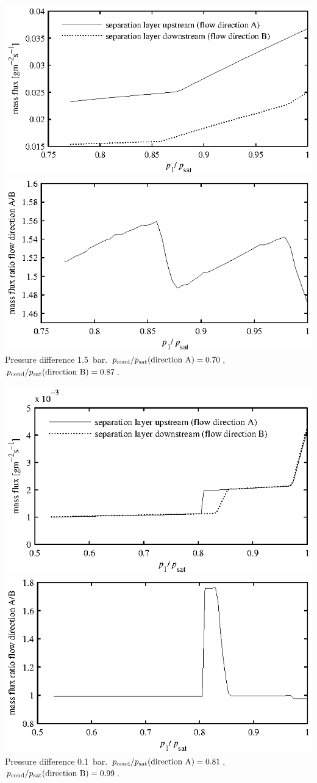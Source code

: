 \documentclass{minimal}
\begin{document}
\includegraphics{figure5.eps}
\includegraphics{figure6.eps}\\
Pressure difference 1.5~bar.
$p_\mathrm{cond}/p_\mathrm{sat}(\hbox{direction A}) = 0.70$,
$p_\mathrm{cond}/p_\mathrm{sat}(\hbox{direction B}) = 0.87$.\bigskip

\includegraphics{figure7.eps}
\includegraphics{figure8.eps}\\
Pressure difference 0.1~bar.
$p_\mathrm{cond}/p_\mathrm{sat}(\hbox{direction A}) = 0.81$,
$p_\mathrm{cond}/p_\mathrm{sat}(\hbox{direction B}) = 0.99$.
\end{document}
